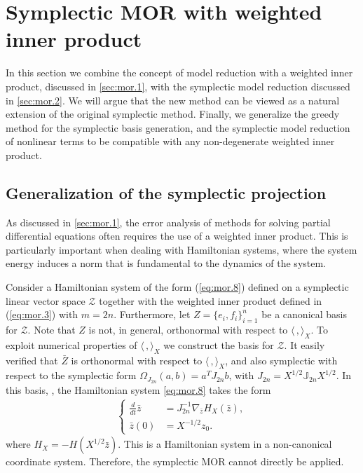 \section{Symplectic MOR with weighted inner product} \label{sec:normmor}

In this section we combine the concept of model reduction with a weighted inner product, discussed in \cref{sec:mor.1}, with the symplectic model reduction discussed in \cref{sec:mor.2}. We will argue that the new method can be viewed as a natural extension of the original symplectic method. Finally, we generalize the greedy method for the symplectic basis generation, and the symplectic model reduction of nonlinear terms to be compatible with any non-degenerate weighted inner product.

\subsection{Generalization of the symplectic projection} \label{sec:normmor.1}
As discussed in \cref{sec:mor.1}, the error analysis of methods for solving partial differential equations often requires the use of a weighted inner product. This is particularly important when dealing with Hamiltonian systems, where the system energy induces a norm that is fundamental to the dynamics of the system.
   
Consider a Hamiltonian system of the form (\ref{eq:mor.8}) defined on a symplectic linear vector space $\mathcal Z$ together with the weighted inner product defined in (\ref{eq:mor.3}) with $m=2n$. Furthermore, let $Z = \{ e_i,f_i \}_{i=1}^n$ be a canonical  basis for $\mathcal Z$. Note that $Z$ is not, in general, orthonormal with respect to $\langle\,,\rangle_X$. To exploit numerical properties of $\langle\,,\rangle_X$ we construct the basis  for $\mathcal Z$. It easily verified that $\bar Z$ is orthonormal with respect to $\langle\,,\rangle_X$, and also symplectic with respect to the symplectic form $\Omega_{J_{2n}}(a,b) = a^T J_{2n} b $, with $J_{2n} = X^{1/2} \mathbb J_{2n}X^{1/2}$. In this basis, , the Hamiltonian system \eqref{eq:mor.8} takes the form
\begin{eqnarray} \label{p1.eq:nommor.0.1}
	\left\{
	\begin{aligned}
		\frac d {dt} \bar z &= J^{-1}_{2n} \nabla_{\bar z} H_X(\bar z), \\
		\bar z(0) &= X^{-1/2}z_0.
	\end{aligned}
	\right.
\end{eqnarray}
where $H_X = -H(X^{1/2}\bar z)$. This is a Hamiltonian system in a non-canonical coordinate system. Therefore, the symplectic MOR cannot directly be applied.


